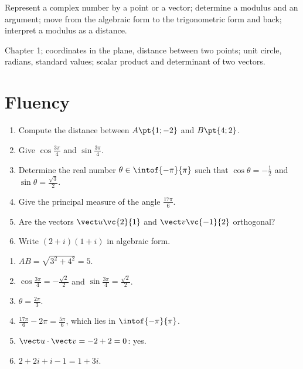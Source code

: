 
\begin{objectives}
Represent a complex number by a point or a vector; determine a modulus and an argument; move from the algebraic form to the trigonometric form and back; interpret a modulus as a distance.
\end{objectives}
\begin{prerequisites}
Chapter 1; coordinates in the plane, distance between two points; unit circle, radians, standard values; scalar product and determinant of two vectors.
\end{prerequisites}

\section{Fluency}
\begin{fluency}
\begin{enumerate}
\item Compute the distance between $A\pt{1;-2}$ and $B\pt{4;2}$.
\item Give $\cos\frac{3\pi}{4}$ and $\sin\frac{3\pi}{4}$.
\item Determine the real number $\theta\in\intof{-\pi}{\pi}$ such that $\cos\theta=-\frac12$ and $\sin\theta=\frac{\sqrt3}2$.
\item Give the principal measure of the angle $\frac{17\pi}{6}$.
\item Are the vectors $\vect u\vc{2}{1}$ and $\vect v\vc{-1}{2}$ orthogonal?
\item Write $(2+i)(1+i)$ in algebraic form.
\end{enumerate}
\end{fluency}
\begin{solution}[Fluency]
\begin{enumerate}
\item $AB=\sqrt{3^2+4^2}=5$.
\item $\cos\frac{3\pi}{4}=-\frac{\sqrt2}2$ and $\sin\frac{3\pi}{4}=\frac{\sqrt2}2$.
\item $\theta=\frac{2\pi}{3}$.
\item $\frac{17\pi}{6}-2\pi=\frac{5\pi}{6}$, which lies in $\intof{-\pi}{\pi}$.
\item $\vect u\cdot\vect v=-2+2=0$: yes.
\item $2+2i+i-1=1+3i$.
\end{enumerate}
\end{solution}

